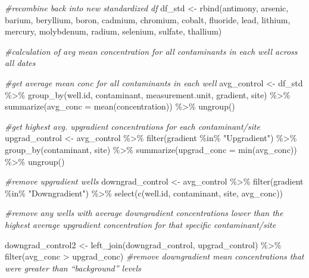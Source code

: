 \documentclass[12pt, twoside]{amherstthesis}
\newenvironment{Shaded}{\begin{snugshade}}{\end{snugshade}}
\newcommand{\AttributeTok}[1]{\textcolor[rgb]{0.77,0.63,0.00}{#1}}
\newcommand{\CommentTok}[1]{\textcolor[rgb]{0.56,0.35,0.01}{\textit{#1}}}
\newcommand{\FunctionTok}[1]{\textcolor[rgb]{0.00,0.00,0.00}{#1}}
\newcommand{\NormalTok}[1]{#1}
\newcommand{\OtherTok}[1]{\textcolor[rgb]{0.56,0.35,0.01}{#1}}
\newcommand{\SpecialCharTok}[1]{\textcolor[rgb]{0.00,0.00,0.00}{#1}}
\newcommand{\StringTok}[1]{\textcolor[rgb]{0.31,0.60,0.02}{#1}}
\begin{document}
\begin{Shaded}
\begin{Highlighting}[]
\CommentTok{\#recombine back into new standardized df}
\NormalTok{df\_std }\OtherTok{\textless{}{-}} \FunctionTok{rbind}\NormalTok{(antimony, arsenic, barium, beryllium, boron, cadmium,}
\NormalTok{                chromium, cobalt, fluoride, lead, lithium, mercury, }
\NormalTok{                molybdenum, radium, selenium, sulfate, thallium)}
\end{Highlighting}
\end{Shaded}
\begin{Shaded}
\begin{Highlighting}[]
\CommentTok{\#calculation of avg mean concentration for all contaminants in each well across all dates}

\CommentTok{\#get average mean conc for all contaminants in each well}
\NormalTok{avg\_control }\OtherTok{\textless{}{-}}\NormalTok{ df\_std }\SpecialCharTok{\%\textgreater{}\%}
  \FunctionTok{group\_by}\NormalTok{(well.id, contaminant, measurement.unit, gradient, site) }\SpecialCharTok{\%\textgreater{}\%}
  \FunctionTok{summarize}\NormalTok{(}\AttributeTok{avg\_conc =} \FunctionTok{mean}\NormalTok{(concentration)) }\SpecialCharTok{\%\textgreater{}\%}
  \FunctionTok{ungroup}\NormalTok{()}

\CommentTok{\#get highest avg. upgradient concentrations for each contaminant/site}
\NormalTok{upgrad\_control }\OtherTok{\textless{}{-}}\NormalTok{ avg\_control }\SpecialCharTok{\%\textgreater{}\%}
  \FunctionTok{filter}\NormalTok{(gradient }\SpecialCharTok{\%in\%} \StringTok{"Upgradient"}\NormalTok{) }\SpecialCharTok{\%\textgreater{}\%}
  \FunctionTok{group\_by}\NormalTok{(contaminant, site) }\SpecialCharTok{\%\textgreater{}\%}
  \FunctionTok{summarize}\NormalTok{(}\AttributeTok{upgrad\_conc =} \FunctionTok{min}\NormalTok{(avg\_conc)) }\SpecialCharTok{\%\textgreater{}\%}
  \FunctionTok{ungroup}\NormalTok{()}

\CommentTok{\#remove upgradient wells}
\NormalTok{downgrad\_control }\OtherTok{\textless{}{-}}\NormalTok{ avg\_control }\SpecialCharTok{\%\textgreater{}\%}
  \FunctionTok{filter}\NormalTok{(gradient }\SpecialCharTok{\%in\%} \StringTok{"Downgradient"}\NormalTok{) }\SpecialCharTok{\%\textgreater{}\%}
  \FunctionTok{select}\NormalTok{(}\FunctionTok{c}\NormalTok{(well.id, contaminant, site, avg\_conc))}

\CommentTok{\#remove any wells with average downgradient concentrations lower than the highest average upgradient concentration for that specific contaminant/site}

\NormalTok{downgrad\_control2 }\OtherTok{\textless{}{-}} \FunctionTok{left\_join}\NormalTok{(downgrad\_control, upgrad\_control) }\SpecialCharTok{\%\textgreater{}\%}
  \FunctionTok{filter}\NormalTok{(avg\_conc }\SpecialCharTok{\textgreater{}}\NormalTok{ upgrad\_conc) }\CommentTok{\#remove downgradient mean concentrations that were greater than “background” levels}



\end{Highlighting}
\end{Shaded}
\end{document}
